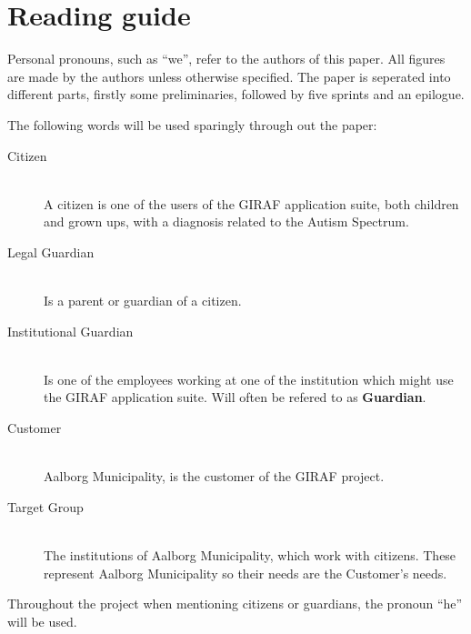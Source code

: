 \section*{Reading guide}
Personal pronouns, such as \enquote{we}, refer to the authors of this paper. 
All figures are made by the authors unless otherwise specified.
The paper is seperated into different parts, firstly some preliminaries, followed by five sprints and an epilogue.


The following words will be used sparingly through out the paper:
\begin{description}
    \item[Citizen] \hfill\\
        A citizen is one of the users of the GIRAF application suite, both children and grown ups, with a diagnosis related to the Autism Spectrum.
	\item[Legal Guardian] \hfill\\
        Is a parent or guardian of a citizen.
    \item[Institutional Guardian] \hfill\\
        Is one of the employees working at one of the institution which might use the GIRAF application suite. Will often be refered to as \textbf{Guardian}.
	\item[Customer] \hfill\\
        Aalborg Municipality, is the customer of the GIRAF project.
	\item[Target Group] \hfill\\
        The institutions of Aalborg Municipality, which work with citizens. These represent Aalborg Municipality so their needs are the Customer's needs.
\end{description}
Throughout the project when mentioning citizens or guardians, the pronoun \enquote{he} will be used.
